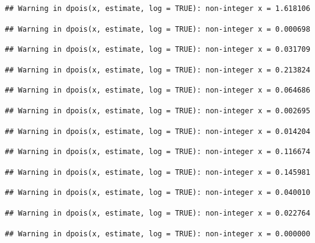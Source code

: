 \documentclass[]{article}
\begin{document}
\begin{verbatim}
## Warning in dpois(x, estimate, log = TRUE): non-integer x = 1.618106
\end{verbatim}

\begin{verbatim}
## Warning in dpois(x, estimate, log = TRUE): non-integer x = 0.000698
\end{verbatim}

\begin{verbatim}
## Warning in dpois(x, estimate, log = TRUE): non-integer x = 0.031709
\end{verbatim}

\begin{verbatim}
## Warning in dpois(x, estimate, log = TRUE): non-integer x = 0.213824
\end{verbatim}

\begin{verbatim}
## Warning in dpois(x, estimate, log = TRUE): non-integer x = 0.064686
\end{verbatim}

\begin{verbatim}
## Warning in dpois(x, estimate, log = TRUE): non-integer x = 0.002695
\end{verbatim}

\begin{verbatim}
## Warning in dpois(x, estimate, log = TRUE): non-integer x = 0.014204
\end{verbatim}

\begin{verbatim}
## Warning in dpois(x, estimate, log = TRUE): non-integer x = 0.116674
\end{verbatim}

\begin{verbatim}
## Warning in dpois(x, estimate, log = TRUE): non-integer x = 0.145981
\end{verbatim}

\begin{verbatim}
## Warning in dpois(x, estimate, log = TRUE): non-integer x = 0.040010
\end{verbatim}

\begin{verbatim}
## Warning in dpois(x, estimate, log = TRUE): non-integer x = 0.022764
\end{verbatim}

\begin{verbatim}
## Warning in dpois(x, estimate, log = TRUE): non-integer x = 0.000000
\end{verbatim}
\end{document}
